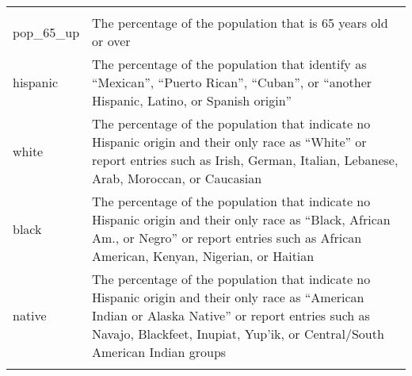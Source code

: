 \documentclass[12pt,twoside]{reedthesis}
\begin{document}
\begin{longtable}[]{@{}ll@{}}
\begin{minipage}[t]{0.50\columnwidth}
\end{minipage}\tabularnewline
\begin{minipage}[t]{0.44\columnwidth}\raggedright
pop\_65\_up\strut
\end{minipage} & \begin{minipage}[t]{0.50\columnwidth}\raggedright
The percentage of the population that is 65 years old or over\strut
\end{minipage}\tabularnewline
\begin{minipage}[t]{0.44\columnwidth}\raggedright
hispanic\strut
\end{minipage} & \begin{minipage}[t]{0.50\columnwidth}\raggedright
The percentage of the population that identify as ``Mexican'', ``Puerto Rican'', ``Cuban'', or ``another Hispanic, Latino, or Spanish origin''\strut
\end{minipage}\tabularnewline
\begin{minipage}[t]{0.44\columnwidth}\raggedright
white\strut
\end{minipage} & \begin{minipage}[t]{0.50\columnwidth}\raggedright
The percentage of the population that indicate no Hispanic origin and their only race as ``White'' or report entries such as Irish, German, Italian, Lebanese, Arab, Moroccan, or Caucasian\strut
\end{minipage}\tabularnewline
\begin{minipage}[t]{0.44\columnwidth}\raggedright
black\strut
\end{minipage} & \begin{minipage}[t]{0.50\columnwidth}\raggedright
The percentage of the population that indicate no Hispanic origin and their only race as ``Black, African Am., or Negro'' or report entries such as African American, Kenyan, Nigerian, or Haitian\strut
\end{minipage}\tabularnewline
\begin{minipage}[t]{0.44\columnwidth}\raggedright
native\strut
\end{minipage} & \begin{minipage}[t]{0.50\columnwidth}\raggedright
The percentage of the population that indicate no Hispanic origin and their only race as ``American Indian or Alaska Native'' or report entries such as Navajo, Blackfeet, Inupiat, Yup'ik, or Central/South American Indian groups\strut
\end{minipage}\tabularnewline
\begin{minipage}[t]{0.44\columnwidth}\raggedright

\end{minipage}
\end{longtable}
\end{document}

